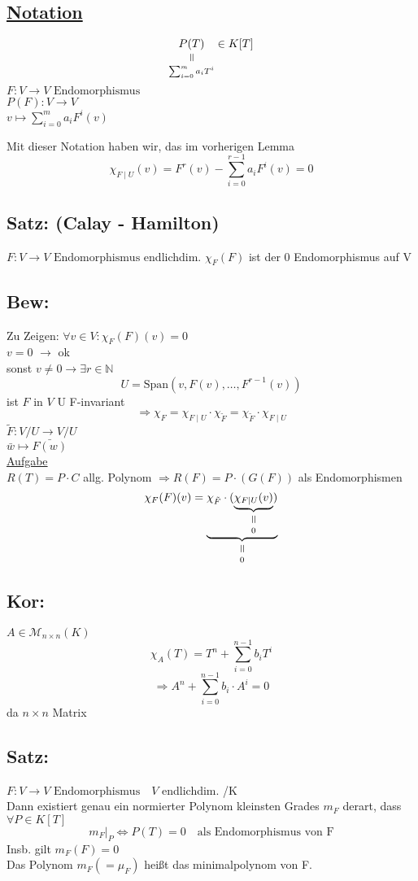 \documentclass[titlepage,12pt,a4paper,ngerman]{report}
\newcommand{\verteq}{\rotatebox{90}{$\,=$}}
\newcommand{\equalto}[2]{\underset{\scriptstyle\overset{\mkern4mu\verteq}{#2}}{#1}}
\newcommand{\enph}{F: V \to V \textrm{ Endomorphismus}}
\begin{document}
\noindent
\subsection*{\underline{Notation}}
$$\equalto{P(T)}{\sum^m_{i=0} a_i T^i} \in K[T]$$
$\enph$\\
$P(F): V\to V $\\
$ v\mapsto \sum^m_{i=0} a_i F^i(v)$

Mit dieser Notation haben wir, das im vorherigen Lemma
$$\chi_{F \mid U} (v) = F^r(v) - \sum^{r-1}_{i=0} a_i F^i(v) = 0$$
\subsection{Satz: (Calay - Hamilton)}
$\enph $ endlichdim.
$\chi_F(F)$ ist der 0 Endomorphismus auf V
\subsection{Bew:}
Zu Zeigen:
$\forall v\in V : \chi_F(F)(v) = 0$\\
\underline{$v=0$} $\rightarrow$ ok\\
sonst $v\neq 0 \rightarrow \exists r \in \mathbb{N}$
$$ U = \textrm{Span}(v,F(v), \dots, F^{r-1}(v))$$
ist $F$ in $V$
U F-invariant
$$\Rightarrow \chi_F = \chi_{F \mid U} \cdot \chi_{\tilde{F}} = \chi_{\tilde{F}} \cdot \chi_{F \mid U}$$
$\tilde{F}: V/U \to V/U$\\
$\bar{w} \mapsto \bar{F(w)}$\\
\underline{Aufgabe}\\
$R(T) = P \cdot C$ allg. Polynom
$\Rightarrow R(F) = P \cdot (G(F))$ als Endomorphismen
$$\chi_F(F)(v) = \equalto{\underbrace{\chi_{\tilde{F}} \cdot (\equalto{\underbrace{\chi_{F \mid U}(v)}}{0})}}{0} $$

\subsection{Kor:}
$A \in \mathcal{M}_{n\times n}(K)$
$$\chi_A(T) = T^n + \sum^{n-1}_{i=0} b_i T^i$$
$$\Rightarrow A^n + \sum^{n-1}_{i=0} b_i \cdot A^i = 0$$
da $n\times n$ Matrix
\subsection{Satz:}
$\enph \quad V$ endlichdim. /K\\
Dann existiert genau ein normierter Polynom kleinsten Grades $m_F$ derart, dass $\forall P\in K[T]$\\
$$m_F | _P \Leftrightarrow P(T) = 0  \quad \textrm{als Endomorphismus von F}$$
Insb. gilt $m_F(F) = 0$\\
Das Polynom $m_F (= \mu _F)$ heißt das minimalpolynom von F.\\																										
\end{document}
